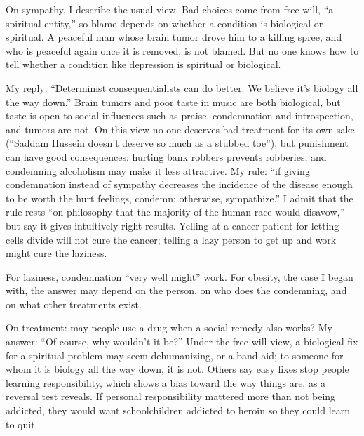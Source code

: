 On sympathy, I describe the usual view. Bad choices come from free will, ``a spiritual entity,'' so blame depends on whether a condition is biological or spiritual. A peaceful man whose brain tumor drove him to a killing spree, and who is peaceful again once it is removed, is not blamed. But no one knows how to tell whether a condition like depression is spiritual or biological.

My reply: ``Determinist consequentialists can do better. We believe it's biology all the way down.'' Brain tumors and poor taste in music are both biological, but taste is open to social influences such as praise, condemnation and introspection, and tumors are not. On this view no one deserves bad treatment for its own sake (``Saddam Hussein doesn't deserve so much as a stubbed toe''), but punishment can have good consequences: hurting bank robbers prevents robberies, and condemning alcoholism may make it less attractive. My rule: ``if giving condemnation instead of sympathy decreases the incidence of the disease enough to be worth the hurt feelings, condemn; otherwise, sympathize.'' I admit that the rule rests ``on philosophy that the majority of the human race would disavow,'' but say it gives intuitively right results. Yelling at a cancer patient for letting cells divide will not cure the cancer; telling a lazy person to get up and work might cure the laziness.


For laziness, condemnation ``very well might'' work. For obesity, the case I began with, the answer may depend on the person, on who does the condemning, and on what other treatments exist. 

On treatment: may people use a drug when a social remedy also works? My answer: ``Of course, why wouldn't it be?'' Under the free-will view, a biological fix for a spiritual problem may seem dehumanizing, or a band-aid; to someone for whom it is biology all the way down, it is not. Others say easy fixes stop people learning responsibility, which shows a bias toward the way things are, as a reversal test reveals. If personal responsibility mattered more than not being addicted, they would want schoolchildren addicted to heroin so they could learn to quit.


